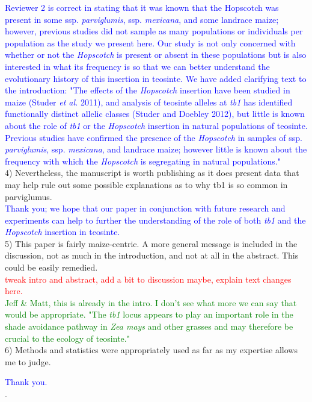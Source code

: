 \documentclass[11pt]{article}
\newcommand{\res}[1]{\noindent \textcolor{blue}{{#1}} \\}
\newcommand{\jri}[1]{\noindent \textcolor{red}{{#1}} \\}
\newcommand{\lev}[1]{\noindent \textcolor{green}{{#1}} \\}
\begin{document}
\res{Reviewer 2 is correct in stating that it was known that the Hopscotch was present in some ssp. \emph{parviglumis}, ssp. \emph{mexicana}, and some landrace maize; however, previous studies did not sample as many populations or individuals per population as the study we present here. Our study is not only concerned with whether or not the \emph{Hopscotch} is present or absent in these populations but is also interested in what its frequency is so that we can better understand the evolutionary history of this insertion in teosinte. We have added clarifying text to the introduction: "The effects of the \emph{Hopscotch} insertion have been studied in maize (Studer \emph{et al.} 2011), and analysis of teosinte alleles at \emph{tb1} has identified functionally distinct allelic classes (Studer and Doebley 2012), but little is known about the role of \emph{tb1} or the \emph{Hopscotch} insertion in natural populations of teosinte. Previous studies have confirmed the presence of the \emph{Hopscotch} in samples of ssp. \emph{parviglumis}, ssp. \emph{mexicana}, and landrace maize; however little is known about the frequency with which the \emph{Hopscotch} is segregating in natural populations."}


4) Nevertheless, the manuscript is worth publishing as it does present data that may help rule out some possible explanations as to why tb1 is so common in parviglumus.\\

\res{Thank you; we hope that our paper in conjunction with future research and experiments can help to further the understanding of the role of both \emph{tb1} and the \emph{Hopscotch} insertion in teosinte.}

5) This paper is fairly maize-centric. A more general message is included in the discussion, not as much in the introduction, and not at all in the abstract. This could be easily remedied.\\

\jri{tweak intro and abstract, add a bit to discussion maybe, explain text changes here.}
\lev{Jeff & Matt, this is already in the intro. I don't see what more we can say that would be appropriate. "The \emph{tb1} locus appears to play an important role in the shade avoidance pathway in \emph{Zea mays} and other grasses and may therefore be crucial to the ecology of teosinte."}

6) Methods and statistics were appropriately used as far as my expertise allows me to judge.

\res{Thank you.}. 
\end{document}
